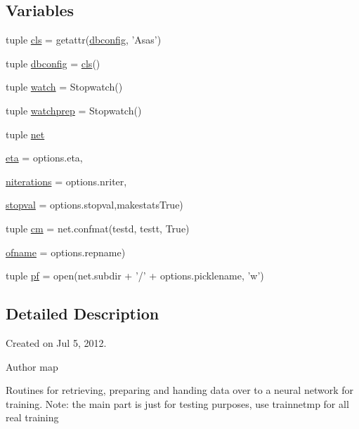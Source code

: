 \subsection*{Variables}
\begin{DoxyCompactItemize}
\item 
tuple \hyperlink{namespacetrainnet_a92c95c206ed27e0de8dec1cb68a1f6bb}{cls} = getattr(\hyperlink{namespacetrainnet_a293be6aa425ca070702d0f999f1ea68d}{dbconfig}, 'Asas')
\item 
tuple \hyperlink{namespacetrainnet_a293be6aa425ca070702d0f999f1ea68d}{dbconfig} = \hyperlink{namespacetrainnet_a92c95c206ed27e0de8dec1cb68a1f6bb}{cls}()
\item 
tuple \hyperlink{namespacetrainnet_a53e6fa3504764aa1a0d61b916af6358a}{watch} = Stopwatch()
\item 
tuple \hyperlink{namespacetrainnet_ad40ddd24354da1881bc9fe8b6547b5fa}{watchprep} = Stopwatch()
\item 
tuple \hyperlink{namespacetrainnet_afce55f5d26936ba4b8622fc19ba56446}{net}
\item 
\hyperlink{namespacetrainnet_a6eceefa845bebe7f22951cbc18af394b}{eta} = options.eta,
\item 
\hyperlink{namespacetrainnet_a531ebfd51f4947ab5422381d729a8756}{niterations} = options.nriter,
\item 
\hyperlink{namespacetrainnet_a8c0014c8c751971aa9ac67420b64d9a5}{stopval} = options.stopval,makestatsTrue)
\item 
tuple \hyperlink{namespacetrainnet_afdfd7e6bbac45ccf3826d60cf8636299}{cm} = net.confmat(testd, testt, True)
\item 
\hyperlink{namespacetrainnet_a3e3b093ef37c5ac35ebdcbfc08bf52e1}{ofname} = options.repname)
\item 
tuple \hyperlink{namespacetrainnet_aacdb2e9555d0d0aa59e25c64e45d48b2}{pf} = open(net.subdir + '/' + options.picklename, 'w')
\end{DoxyCompactItemize}


\subsection{Detailed Description}
Created on Jul 5, 2012. \begin{DoxyAuthor}{Author}
map 
\end{DoxyAuthor}
Routines for retrieving, preparing and handing data over to a neural network for training. Note: the main part is just for testing purposes, use trainnetmp for all real training

